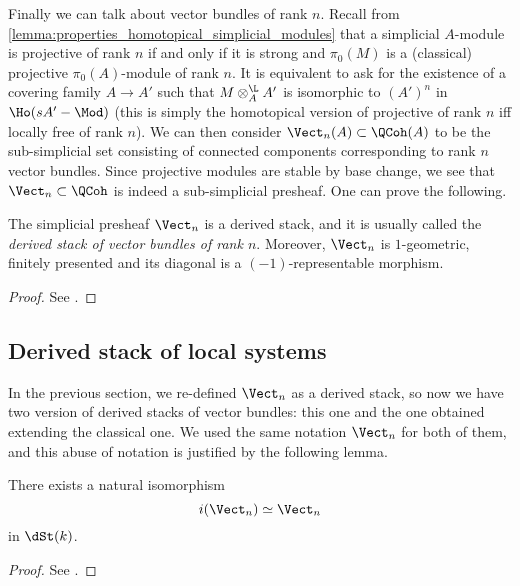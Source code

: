             Finally we can talk about vector bundles of rank $n$. Recall from \cref{lemma:properties_homotopical_simplicial_modules} that a simplicial $A$-module is projective of rank $n$ if and only if it is strong and $\pi_0(M)$ is a (classical) projective $\pi_0(A)$-module of rank $n$. It is equivalent to ask for the existence of a covering family $A \to A'$ such that $M \otimes^{\L}_A A'$ is isomorphic to $(A')^n$ in $\Ho(sA'-\Mod)$ (this is simply the homotopical version of projective of rank $n$ iff locally free of rank $n$). 
            We can then consider $\Vect_n(A) \subset \QCoh(A)$ to be the sub-simplicial set consisting of connected components corresponding to rank $n$ vector bundles. Since projective modules are stable by base change, we see that $\Vect_n \subset \QCoh$ is indeed a sub-simplicial presheaf.
            One can prove the following.
            \begin{thm}
                The simplicial presheaf $\Vect_n$ is a derived stack, and it is usually called the \emph{derived stack of vector bundles of rank $n$}. Moreover, $\Vect_n$ is $1$-geometric, finitely presented and its diagonal is a $(-1)$-representable morphism. 
            \end{thm}
            \begin{proof}
                See \cite[Corollary~1.3.7.4, Corollary~1.3.7.12]{ToVe:hag2}.
            \end{proof}

        \subsection{Derived stack of local systems}
            In the previous section, we re-defined $\Vect_n$ as a derived stack, so now we have two version of derived stacks of vector bundles: this one and the one obtained extending the classical one. We used the same notation $\Vect_n$ for both of them, and this abuse of notation is justified by the following lemma.
            \begin{lemma}
                \label{lemma:vector_bundles_derived_classic}
                There exists a natural isomorphism \[i(\Vect_n) \simeq \Vect_n \] in $\dSt(k)$.
            \end{lemma}
            \begin{proof}
                See \cite[Lemma~2.2.6.1]{ToVe:hag2}. %
            \end{proof}
            
